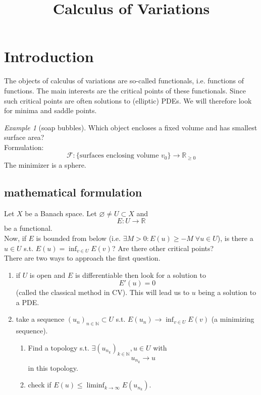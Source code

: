 \documentclass[a4paper, 12pt]{article}
\theoremstyle{plain}
\theoremstyle{definition}
\theoremstyle{lemma}
\theoremstyle{remark}
\theoremstyle{corollary}
\theoremstyle{example}
\newtheorem{example}[theorem]{Example}
\begin{document}
	\begin{titlepage} 
		\title{Calculus of Variations}
		\clearpage\maketitle
		\thispagestyle{empty}
	\end{titlepage}
	\tableofcontents
	\newpage
	\section{Introduction}
	The objects of calculus of variations are so-called functionals, i.e. functions of functions. The main interests are the critical points of these functionals. Since such critical points are often solutions to (elliptic) PDEs. We will therefore look for minima and saddle points.
	\begin{example}[soap bubbles]
		Which object encloses a fixed volume and has smallest surface area?\\
		Formulation: \[\mathcal{F}: \{\text{surfaces enclosing volume } v_0\} \to \mathbb{R}_{\geq 0}\]
		The minimizer is a sphere.
	\end{example}
	\subsection{mathematical formulation}
	Let $X$ be a Banach space. Let $\varnothing \neq U \subset X$ and \[E: U \to \mathbb{R}\] be a functional.\\
	Now, if $E$ is bounded from below (i.e. $\exists M>0: E(u) \geq -M \; \forall u \in U$), is there a $u \in U$ s.t. $E(u) = \inf_{v \in U} E(v)$? Are there other critical points?\\
	There are two ways to approach the first question.
	\begin{enumerate}
		\item if $U$ is open and $E$ is differentiable then look for a solution to \[E'(u) = 0\] (called the classical method in CV). This will lead us to $u$ being a solution to a PDE.
		\item take a sequence $(u_n)_{n \in \mathbb{N}} \subset U$ s.t. $E(u_n) \to \inf_{v \in U} E(v)$ (a minimizing sequence).
		\begin{enumerate}
			\item Find a topology s.t. $\exists (u_{n_k})_{k \in \mathbb{N}}, u \in U$ with \[u_{n_k} \to u\] in this topology.
			\item check if $E(u) \leq \liminf_{k \to \infty} E(u_{n_k})$.
		\end{enumerate}
	\end{enumerate}
\end{document}
